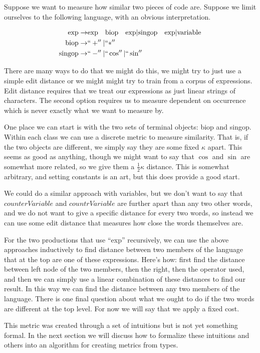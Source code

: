 Suppose we want to measure how similar two pieces of code are.
Suppose we limit ourselves to the following language, with an obvious interpretation.

\begin{align*}
\text{exp} \to& \text{exp}\quad \text{biop} \quad \text{exp} | \text{singop} \quad \text{exp} | \text{variable} \\
\text{biop} \to & ``+'' | ``*'' \\ 
\text{singop} \to& ``-'' | ``\cos'' | ``\sin''
\end{align*}

There are many ways to do that we might do this,
we might try to just use a simple edit distance
or we might might try to train from a corpus of expressions.
Edit distance requires that we treat our expressions as just linear strings of characters.
The second option requires us to measure dependent on occurrence which is never exactly what we want to measure by.

One place we can start is with the two sets of terminal objects: biop and singop.
Within each class we can use a discrete metric to measure similarity.
That is, if the two objects are different, we simply say they are some fixed $\kappa$ apart.
This seems as good as anything, though we might want to say that $\cos$ and $\sin$ are somewhat more related, so we give them a $\frac{1}{2}\kappa$ distance.
This is somewhat arbitrary, and setting constants is an art, but this does provide a good start.

We could do a similar approach with variables, but we don't want to say that $counterVariable$ and $countrVariable$ are further apart than any two other words,
and we do not want to give a specific distance for every two words, so instead we can use some edit distance that measures how close the words themselves are.

For the two productions that use ``exp'' recursively, we can use the above approaches inductively to find distance between two members of the language that at the top are one of these expressions.
Here's how: first find the distance between left node of the two members, then the right, then the operator used, and then we can simply use a linear combination of these distances to find our result.
In this way we can find the distance between any two members of the language.
There is one final question about what we ought to do if the two words are different at the top level.
For now we will say that we apply a fixed cost.

This metric was created through a set of intuitions but is not yet something formal.
In the next section we will discuss how to formalize these intuitions and others into an algorithm for creating metrics from types.